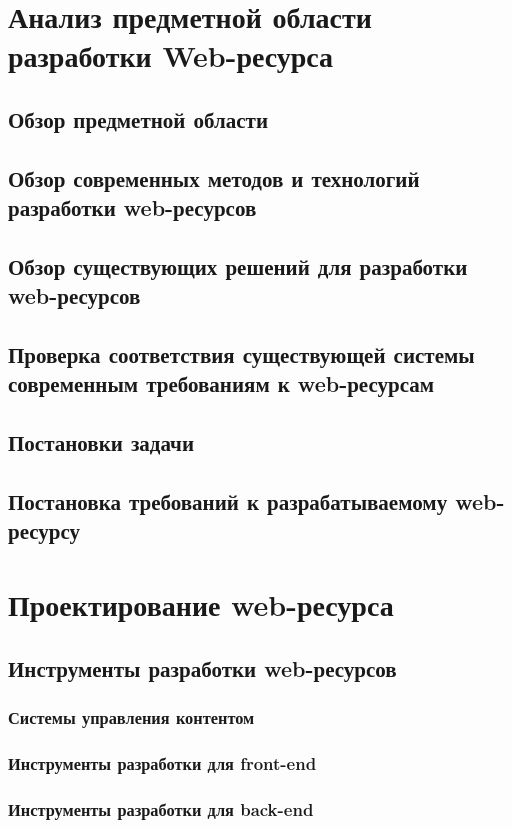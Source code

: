 \section{Анализ предметной области разработки Web-ресурса}
    \subsection{Обзор предметной области}
    \subsection{Обзор современных методов и технологий разработки web-ресурсов}
    \subsection{Обзор существующих решений для разработки web-ресурсов}
    \subsection{Проверка соответствия существующей системы современным требованиям к web-ресурсам}
    \subsection{Постановки задачи}
    \subsection{Постановка требований к разрабатываемому web-ресурсу}

\section{Проектирование web-ресурса}
    \subsection{Инструменты разработки web-ресурсов}
        \subsubsection{Системы управления контентом}
        \subsubsection{Инструменты разработки для front-end}
        \subsubsection{Инструменты разработки для back-end}
